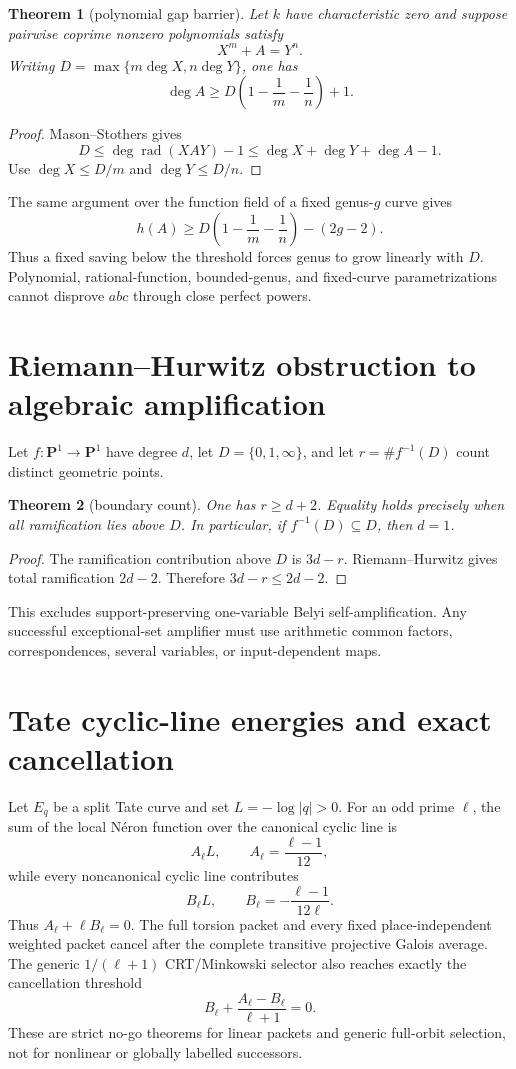 \documentclass[11pt]{article}
\newtheorem{theorem}{Theorem}[section]
\theoremstyle{definition}
\theoremstyle{remark}
\begin{document}
\begin{theorem}[polynomial gap barrier]
Let $k$ have characteristic zero and suppose pairwise coprime nonzero
polynomials satisfy
\[
 X^m+A=Y^n.
\]
Writing $D=\max\{m\deg X,n\deg Y\}$, one has
\[
 \deg A\ge D\left(1-\frac1m-\frac1n\right)+1.
\]
\end{theorem}

\begin{proof}
Mason--Stothers gives
\[
 D\le \deg\operatorname{rad}(XAY)-1
 \le \deg X+\deg Y+\deg A-1.
\]
Use $\deg X\le D/m$ and $\deg Y\le D/n$.
\end{proof}

The same argument over the function field of a fixed genus-$g$ curve gives
\[
 h(A)\ge
 D\left(1-\frac1m-\frac1n\right)-(2g-2).
\]
Thus a fixed saving below the threshold forces genus to grow linearly with
$D$.  Polynomial, rational-function, bounded-genus, and fixed-curve
parametrizations cannot disprove $abc$ through close perfect powers.

\section{Riemann--Hurwitz obstruction to algebraic amplification}

Let $f:\mathbf P^1\to\mathbf P^1$ have degree $d$, let
$D=\{0,1,\infty\}$, and let $r=\#f^{-1}(D)$ count distinct geometric points.

\begin{theorem}[boundary count]
One has $r\ge d+2$.  Equality holds precisely when all ramification lies above
$D$.  In particular, if $f^{-1}(D)\subseteq D$, then $d=1$.
\end{theorem}

\begin{proof}
The ramification contribution above $D$ is $3d-r$.  Riemann--Hurwitz gives
total ramification $2d-2$.  Therefore $3d-r\le2d-2$.
\end{proof}

This excludes support-preserving one-variable Belyi self-amplification.  Any
successful exceptional-set amplifier must use arithmetic common factors,
correspondences, several variables, or input-dependent maps.

\section{Tate cyclic-line energies and exact cancellation}

Let $E_q$ be a split Tate curve and set $L=-\log|q|>0$.  For an odd prime
$\ell$, the sum of the local N\'eron function over the canonical cyclic line is
\[
 A_\ell L,
 \qquad A_\ell=\frac{\ell-1}{12},
\]
while every noncanonical cyclic line contributes
\[
 B_\ell L,
 \qquad B_\ell=-\frac{\ell-1}{12\ell}.
\]
Thus $A_\ell+\ell B_\ell=0$.  The full torsion packet and every fixed
place-independent weighted packet cancel after the complete transitive
projective Galois average.  The generic $1/(\ell+1)$ CRT/Minkowski selector
also reaches exactly the cancellation threshold
\[
 B_\ell+\frac{A_\ell-B_\ell}{\ell+1}=0.
\]
These are strict no-go theorems for linear packets and generic full-orbit
selection, not for nonlinear or globally labelled successors.
\end{document}
